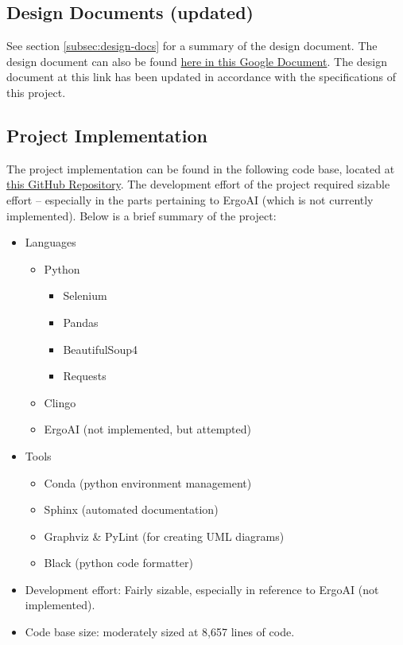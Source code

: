 \documentclass[12pt]{article}
\def \repoLink{https://github.com/AdebayoBraimah/CSE505}
\def \desDocLink{https://docs.google.com/document/d/1t48in8rdzC_VOijfAOP23C_YgAQxkow5eaE7AXEVUYM/edit?usp=sharing}
\begin{document}
    \subsection{Design Documents (updated)}
    \label{subsec:des-doc-up}

    See section \ref{subsec:design-docs} for a summary of the design document. The design document can also be found \href{\desDocLink}{here in this Google Document}. The design document at this link has been updated in accordance with the specifications of this project.

    \subsection{Project Implementation}
    \label{subsec:proj-imp}

    The project implementation can be found in the following code base, located at \href{\repoLink}{this GitHub Repository}. The development effort of the project required sizable effort -- especially in the parts pertaining to ErgoAI (which is not currently implemented). Below is a brief summary of the project:

    \begin{itemize}
        \item Languages
        \begin{itemize}
            \item Python
            \begin{itemize}
                \item Selenium
                \item Pandas
                \item BeautifulSoup4
                \item Requests
            \end{itemize}
            \item Clingo
            \item ErgoAI (not implemented, but attempted)
        \end{itemize}
        \item Tools
            \begin{itemize}
                \item Conda (python environment management)
                \item Sphinx (automated documentation)
                \item Graphviz \& PyLint (for creating UML diagrams)
                \item Black (python code formatter)
            \end{itemize}
        \item Development effort: Fairly sizable, especially in reference to ErgoAI (not implemented).
        \item Code base size: moderately sized at 8,657 lines of code.
    \end{itemize}
\end{document}
